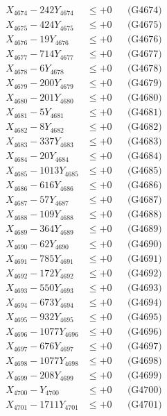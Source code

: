 \documentclass[a4paper,10pt]{article}
\begin{document}
{\begin{align}
X_{4674} - 242Y_{4674} &\leq +0 && \text{(G4674)} \\
X_{4675} - 424Y_{4675} &\leq +0 && \text{(G4675)} \\
X_{4676} - 19Y_{4676} &\leq +0 && \text{(G4676)} \\
X_{4677} - 714Y_{4677} &\leq +0 && \text{(G4677)} \\
X_{4678} - 6Y_{4678} &\leq +0 && \text{(G4678)} \\
X_{4679} - 200Y_{4679} &\leq +0 && \text{(G4679)} \\
X_{4680} - 201Y_{4680} &\leq +0 && \text{(G4680)} \\
\allowbreak
X_{4681} - 5Y_{4681} &\leq +0 && \text{(G4681)} \\
X_{4682} - 8Y_{4682} &\leq +0 && \text{(G4682)} \\
X_{4683} - 337Y_{4683} &\leq +0 && \text{(G4683)} \\
X_{4684} - 20Y_{4684} &\leq +0 && \text{(G4684)} \\
X_{4685} - 1013Y_{4685} &\leq +0 && \text{(G4685)} \\
X_{4686} - 616Y_{4686} &\leq +0 && \text{(G4686)} \\
X_{4687} - 57Y_{4687} &\leq +0 && \text{(G4687)} \\
X_{4688} - 109Y_{4688} &\leq +0 && \text{(G4688)} \\
X_{4689} - 364Y_{4689} &\leq +0 && \text{(G4689)} \\
X_{4690} - 62Y_{4690} &\leq +0 && \text{(G4690)} \\
\allowbreak
X_{4691} - 785Y_{4691} &\leq +0 && \text{(G4691)} \\
X_{4692} - 172Y_{4692} &\leq +0 && \text{(G4692)} \\
X_{4693} - 550Y_{4693} &\leq +0 && \text{(G4693)} \\
X_{4694} - 673Y_{4694} &\leq +0 && \text{(G4694)} \\
X_{4695} - 932Y_{4695} &\leq +0 && \text{(G4695)} \\
X_{4696} - 1077Y_{4696} &\leq +0 && \text{(G4696)} \\
X_{4697} - 676Y_{4697} &\leq +0 && \text{(G4697)} \\
X_{4698} - 1077Y_{4698} &\leq +0 && \text{(G4698)} \\
X_{4699} - 208Y_{4699} &\leq +0 && \text{(G4699)} \\
X_{4700} - Y_{4700} &\leq +0 && \text{(G4700)} \\
\allowbreak
X_{4701} - 1711Y_{4701} &\leq +0 && \text{(G4701)} \\

\end{align}}
\end{document}
